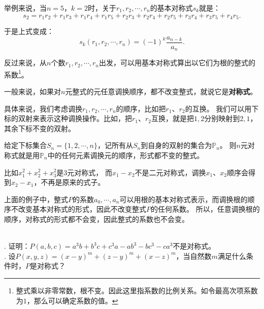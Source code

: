\documentclass[12pt,UTF8]{ctexbook}
\begin{document}
举例来说，当$n=5$，$k=2$时，关于$r_1, r_2, \cdots , r_n$的基本对称式$s_{k}$就是：
$$ s_{2} = r_1r_2 + r_1r_3 + r_1r_4 + r_1r_5 + r_2r_3 + r_2r_4 + r_2r_5 + r_3r_4 + r_3r_5 + r_4r_5.$$

于是上式变成：
$$ s_{k}(r_1, r_2, \cdots , r_n) = (-1)^k \frac{a_{n-k}}{a_n}. $$

反过来说，从$n$个数$r_1, r_2, \cdots , r_n$出发，可以用基本对称式算出以它们为根的整式的系数\footnote{整式乘以非零常数，根不变。因此这里指系数的比例关系。如令最高次项系数为$1$，那么可以确定系数的值。}。

一般来说，如果对$n$元整式的元任意调换顺序，都不改变整式，就说它是\textbf{对称式}。

具体来说，我们考虑调换$r_1, r_2, \cdots , r_n$的顺序，比如把$r_1$、$r_2$的互换。
我们可以用下标的双射来表示这种调换操作。比如，把$r_1$、$r_2$互换，就是把$1,2$分别映射到$2,1$，其余下标不变的双射。

给定下标集合$S_n = \{1, 2, \cdots , n\}$，记所有从$S_n$到自身的双射的集合为$\mathbb{P}_n$。
则$n$元对称式就是用$\mathbb{P}_n$中的任何元素调换元的顺序，形式都不变的整式。

比如$x_1^2 + x_2^2 + x_3^2$是$3$元对称式，
而$x_1 - x_2$不是二元对称式，调换$x_1$、$x_2$顺序会得到$x_2 - x_1$，不再是原来的式子。

上面的例子中，整式$P$的系数$a_0, \cdots, a_n$可以用根的基本对称式表示，而调换根的顺序不改变基本对称式的形式，因此不改变整式$P$的任何系数。
所以，任意调换根的顺序，对称式的形式都不会变，因此整式的系数也不会变。

\begin{et}
    \mbox{} \\
    . 证明：$P(a, b, c) = a^3b + b^3c + c^3a - ab^3 - bc^3 - ca^3$不是对称式。\\
    . 设$P(x, y, z) = (x - y)^m + (z - y)^m + (x - z)^m$，当自然数$m$满足什么条件时，$P$是对称式？\\
\end{et}
\end{document}
